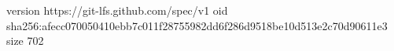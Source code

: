 version https://git-lfs.github.com/spec/v1
oid sha256:afecc070050410ebb7c011f28755982dd6f286d9518be10d513e2c70d90611e3
size 702
